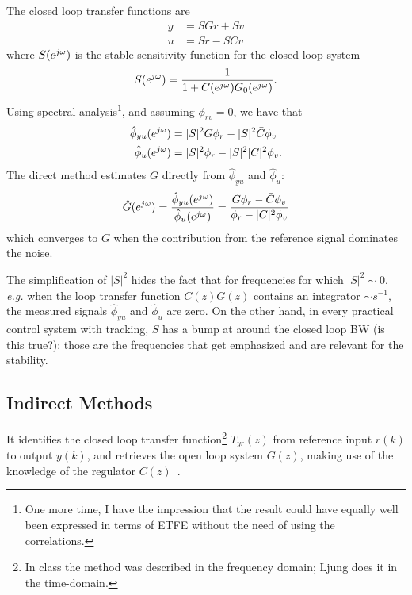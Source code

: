 The closed loop transfer functions are
\begin{equation*}
  \begin{aligned}
    y &= SGr + Sv \\
    u &= Sr - SCv
  \end{aligned}
\end{equation*}
where $S(e^{j\omega})$ is the stable sensitivity function for the closed loop system
\begin{equation*}
  S(e^{j\omega}) = \frac{1}{1+C(e^{j\omega})G_0(e^{j\omega})}.
\end{equation*}
Using spectral analysis\footnote{One more time, I have the impression that the result could have equally well been expressed in terms of ETFE without the need of using the correlations.}, and assuming $\phi_{rv}=0$, we have that
\begin{align*}
  \hat{\phi}_{yu}(e^{j\omega}) &= |S|^2G\phi_r - |S|^2\bar{C}\phi_v \\
  \hat{\phi}_u(e^{j\omega}) &= |S|^2\phi_r - |S|^2|C|^2\phi_v.
\end{align*}
The direct method estimates $G$ directly from $\hat{\phi}_{yu}$ and $\hat{\phi}_u$:
\begin{equation*}
  \hat{G}(e^{j\omega}) = \frac{\hat{\phi}_{yu}(e^{j\omega})}{\hat{\phi}_u(e^{j\omega})} = \frac{G\phi_r - \bar{C}\phi_v}{\phi_r - |C|^2\phi_v}
\end{equation*}
which converges to $G$ when the contribution from the reference signal dominates the noise.

The simplification of $|S|^2$ hides the fact that for frequencies for which $|S|^2\sim 0$, \textit{e.g.} when the loop transfer function $C(z)G(z)$ contains an integrator $\sim s^{-1}$, the measured signals $\hat{\phi}_{yu}$ and $\hat{\phi}_u$ are zero. On the other hand, in every practical control system with tracking, $S$ has a bump at around the closed loop BW (is this true?): those are the frequencies that get emphasized and are relevant for the stability.

\subsection{Indirect Methods}
\label{sec:indirect-methods}

It identifies the closed loop transfer function\footnote{In class the method was described in the frequency domain; Ljung does it in the time-domain.} $T_{yr}(z)$ from reference input $r(k)$ to output $y(k)$, and retrieves the open loop system $G(z)$, making use of the knowledge of the regulator $C(z)$~\cite{ljung}.

